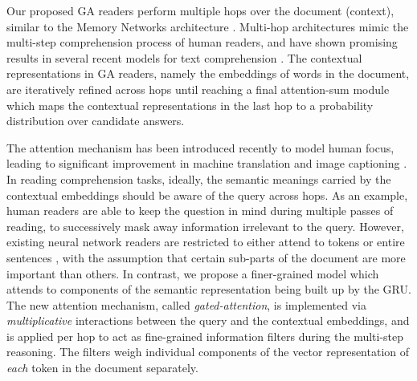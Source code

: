 \documentclass[11pt,a4paper]{article}
\begin{document}
Our proposed GA readers perform multiple hops over the document (context), similar to the Memory Networks architecture \citep{sukhbaatar2015end}.
Multi-hop architectures mimic the multi-step comprehension process of human readers,
and have shown promising results in several recent models for text comprehension \citep{sordoni2016iterative, kumar2015ask, shen2016reasonet}.
The contextual representations in GA readers,
namely the embeddings of words in the document,
are iteratively refined across hops
until reaching a final attention-sum module \citep{kadlec2016text} which maps 
the contextual representations in the last hop to a probability distribution over candidate answers.

The attention mechanism has been introduced recently to model human focus,
leading to significant improvement in machine translation and image captioning \citep{bahdanau2014neural, mnih2014recurrent}.
In reading comprehension tasks, ideally,
the semantic meanings carried by the contextual embeddings should be aware of the query across hops.
As an example,
human readers are able to keep the question in mind during multiple passes of reading,
to successively mask away information irrelevant to the query.
However,
existing neural network readers are restricted to either attend to tokens \citep{hermann2015teaching, chen2016thorough}
or entire sentences \citep{weston2014memory}, with the assumption that certain sub-parts of the document are more important than others.
In contrast, 
we propose a finer-grained model which attends to components of the semantic representation being built up by the GRU.
The new attention mechanism,
called \emph{gated-attention},
is implemented via \emph{multiplicative} interactions between the query and the contextual embeddings,
and is applied per hop to act as fine-grained information filters during the multi-step reasoning. The filters weigh individual components of the vector representation of \textit{each} token in the document separately.
\end{document}
